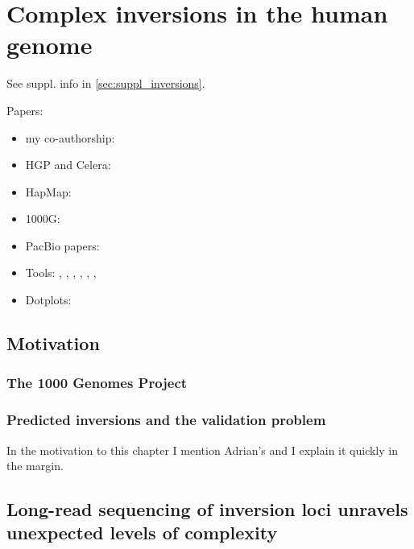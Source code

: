 \chapter{Complex inversions in the human genome}
\label{sec:inversions}

See suppl. info in \cref{sec:suppl_inversions}.

Papers:
\begin{itemize}
\item my co-authorship: \citep{Sudmant2015}
\item HGP and Celera: \citep{Lander2001,Venter2001}
\item HapMap: \citep{InternationalHapMapConsortium2005,Frazer2007,Altshuler2010}
\item 1000G: \citep{Durbin2010,1000GenomesProjectConsortium2012,Auton2015}
\item PacBio papers: \citep{Chaisson2014,Pendleton2015}
\item Tools: \blasr, \last, \mummer, \bwamem, \quiver, \celeraassembler, \maze
\item Dotplots: \citep{Fitch1969,Gibbs1970}
\end{itemize}



\section{Motivation}
\subsection{The 1000 Genomes Project}
\subsection{Predicted inversions and the validation problem}

In the motivation to this chapter I mention Adrian's  and I explain it quickly in the margin.


\section{Long-read sequencing of inversion loci unravels unexpected levels of complexity}


